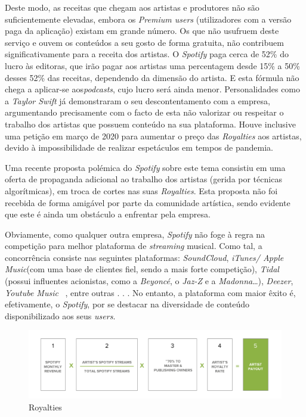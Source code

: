 \documentclass{report}
\begin{document}
Deste modo, as receitas que chegam aos artistas e produtores não são suficientemente elevadas, embora os \textit{Premium users} (utilizadores com a versão paga da aplicação) existam em grande número. Os que não usufruem deste serviço e ouvem os conteúdos a seu gosto de forma gratuita, não contribuem significativamente para a receita dos artistas. O \textit{Spotify} paga cerca de 52\% do lucro às editoras, que irão pagar aos artistas uma percentagem desde 15\% a 50\% desses 52\% das receitas, dependendo da dimensão do artista. E esta fórmula não chega a aplicar-se aos\textit{podcasts}, cujo lucro será ainda menor. Personalidades como a \emph{Taylor Swift} já demonstraram o seu descontentamento com a empresa, argumentando precisamente com o facto de esta não valorizar ou respeitar o trabalho dos artistas que possuem conteúdo na sua plataforma. 
Houve inclusive uma petição em março de 2020 para aumentar o preço das \textit{Royalties} aos artistas, devido à impossibilidade de realizar espetáculos em tempos de pandemia. 

Uma recente proposta polémica do \textit{Spotify} sobre este tema consistiu em uma oferta de propaganda adicional ao trabalho dos artistas (gerida por técnicas algorítmicas), em troca de cortes nas suas \textit{Royalties}. Esta proposta não foi recebida de forma amigável por parte da comunidade artística, sendo evidente que este é ainda um obstáculo a enfrentar pela empresa.

Obviamente, como qualquer outra empresa, \textit{Spotify} não foge à regra na competição para melhor plataforma de \textit{streaming} musical. Como tal, a concorrência consiste nas seguintes plataformas: \textit{SoundCloud}, \textit{iTunes/ Apple Music}(com uma base de clientes fiel, sendo a mais forte competição), \textit{Tidal} (possui influentes acionistas, como a \emph{Beyoncé}, o \emph{Jaz-Z} e a \emph{Madonna}…), \textit{Deezer}, \textit{Youtube Music} ~\cite{manuelpestanamachado2018}, entre outras . . . No entanto, a plataforma com maior êxito é, efetivamente, o \textit{Spotify}, por se destacar na diversidade de conteúdo disponibilizado aos seus \textit{users}.

%
\begin{figure}
    \centering
    \includegraphics[width = \textwidth]{Imagens/royalties.png}
    \caption{Royalties} \label{fig3:Royalties}
\end{figure}
%
\end{document}
